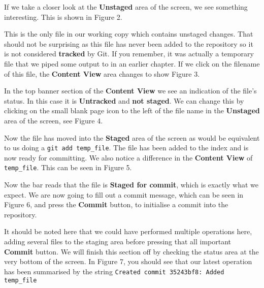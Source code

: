 If we take a closer look at the \textbf{Unstaged} area of the screen, we see something interesting.
This is shown in Figure 2.


This is the only file in our working copy which contains unstaged changes.
That should not be surprising as this file has never been added to the repository so it is not considered \textbf{tracked} by Git.
If you remember, it was actually a temporary file that we piped some output to in an earlier chapter.
If we click on the filename of this file, the \textbf{Content View} area changes to show Figure 3.


In the top banner section of the \textbf{Content View} we see an indication of the file's status.
In this case it is \textbf{Untracked} and \textbf{not staged}.
We can change this by clicking on the small blank page icon to the left of the file name in the \textbf{Unstaged} area of the screen, see Figure 4.


Now the file has moved into the \textbf{Staged} area of the screen as would be equivalent to us doing a \texttt{git add temp\_file}.
The file has been added to the index and is now ready for committing.
We also notice a difference in the \textbf{Content View} of \texttt{temp\_file}.
This can be seen in Figure 5.


Now the bar reads that the file is \textbf{Staged for commit}, which is exactly what we expect.
We are now going to fill out a commit message, which can be seen in Figure 6, and press the \textbf{Commit} button, to initialise a commit into the repository.


It should be noted here that we could have performed multiple operations here, adding several files to the staging area before pressing that all important \textbf{Commit} button.
We will finish this section off by checking the status area at the very bottom of the screen.
In Figure 7, you should see that our latest operation has been summarised by the string \texttt{Created commit 35243bf8: Added temp\_file}

